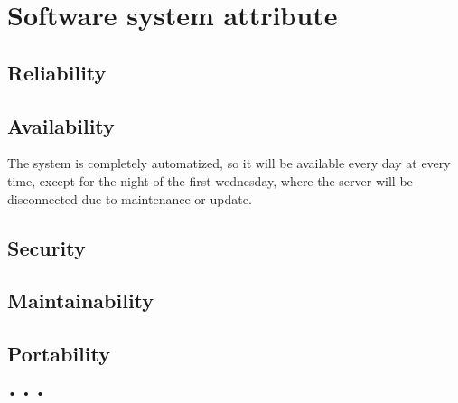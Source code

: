 \section{Software system attribute}
  \subsection{Reliability}
  
  \subsection{Availability}
  The system is completely automatized, so it will be available every day at every time, except for the night of the first wednesday,
  where the server will be disconnected due to maintenance or update.
  \subsection{Security}
  \subsection{Maintainability}
  \subsection{Portability}
 • • •
                                                                                                                                                                                                                                                                                                                                                                                                                                                                                                                                                                                                                                                                                                                                                                                                                                                                                                                                                                                                                                                                                                                  

